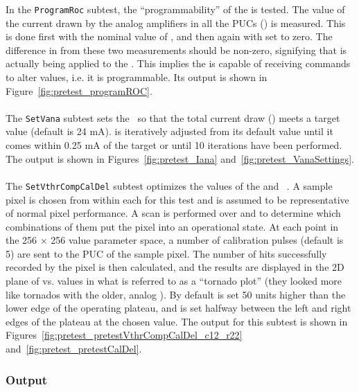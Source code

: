In the {\tt ProgramRoc} subtest, the ``programmability'' of the \roc is tested.
The value of the current drawn by the analog amplifiers in all the PUCs (\iana) is measured.
This is done first with the nominal value of \vana, and then again with \vana set to zero.
The difference in \iana from these two measurements should be non-zero,
signifying that \vana is actually being applied to the \roc.
This implies the \roc is capable of receiving commands to alter \dac values, i.e. it is programmable.
Its output is shown in Figure~\ref{fig:pretest_programROC}.
\\\\
The {\tt SetVana} subtest sets the \vana~\dac so that the total current draw (\iana) meets a target value (default is 24 mA).
\vana is iteratively adjusted from its default value until it comes within 0.25 mA of the target 
or until 10 iterations have been performed.  The output is shown in Figures~\ref{fig:pretest_Iana} and~\ref{fig:pretest_VanaSettings}.
\\\\
The {\tt SetVthrCompCalDel} subtest optimizes the values of the \vthrcomp and \caldel~\dacs.
A sample pixel is chosen from within each \roc for this test and is assumed to be representative of normal pixel performance.
A scan is performed over \vthrcomp and \caldel to determine which combinations of them put the pixel into an operational state.
At each point in the 256 $\times$ 256 value parameter space,
a number of calibration pulses (default is 5) are sent to the PUC of the sample pixel.
The number of hits successfully recorded by the pixel is then calculated,
and the results are displayed in the 2D plane of \vthrcomp vs. \caldel values
in what is referred to as a ``tornado plot'' (they looked more like tornados with the older, analog \roc).
By default \vthrcomp is set 50 units higher than the lower edge of the operating plateau,
and \caldel is set halfway between the left and right edges of the plateau at the chosen \vthrcomp value.
The output for this subtest is shown in Figures~\ref{fig:pretest_pretestVthrCompCalDel_c12_r22} and~\ref{fig:pretest_pretestCalDel}.

\subsubsection{Output}

